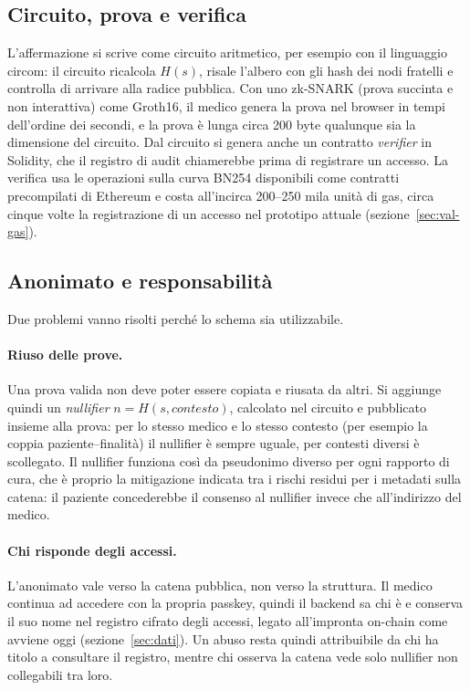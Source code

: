 \subsection{Circuito, prova e verifica}
L'affermazione si scrive come circuito aritmetico, per esempio con il linguaggio circom\cite{circom}: il circuito ricalcola $H(s)$, risale l'albero con gli hash dei nodi fratelli e controlla di arrivare alla radice pubblica. Con uno zk-SNARK (prova succinta e non interattiva) come Groth16\cite{groth16}, il medico genera la prova nel browser in tempi dell'ordine dei secondi, e la prova è lunga circa 200 byte qualunque sia la dimensione del circuito. Dal circuito si genera anche un contratto \emph{verifier} in Solidity, che il registro di audit chiamerebbe prima di registrare un accesso. La verifica usa le operazioni sulla curva BN254 disponibili come contratti precompilati di Ethereum\cite{eip1108} e costa all'incirca 200--250 mila unità di gas, circa cinque volte la registrazione di un accesso nel prototipo attuale (sezione~\ref{sec:val-gas}).

\subsection{Anonimato e responsabilità}
Due problemi vanno risolti perché lo schema sia utilizzabile.

\paragraph{Riuso delle prove.} Una prova valida non deve poter essere copiata e riusata da altri. Si aggiunge quindi un \emph{nullifier} $n = H(s, \mathit{contesto})$, calcolato nel circuito e pubblicato insieme alla prova: per lo stesso medico e lo stesso contesto (per esempio la coppia paziente--finalità) il nullifier è sempre uguale, per contesti diversi è scollegato. Il nullifier funziona così da pseudonimo diverso per ogni rapporto di cura, che è proprio la mitigazione indicata tra i rischi residui per i metadati sulla catena: il paziente concederebbe il consenso al nullifier invece che all'indirizzo del medico.

\paragraph{Chi risponde degli accessi.} L'anonimato vale verso la catena pubblica, non verso la struttura. Il medico continua ad accedere con la propria passkey, quindi il backend sa chi è e conserva il suo nome nel registro cifrato degli accessi, legato all'impronta on-chain come avviene oggi (sezione~\ref{sec:dati}). Un abuso resta quindi attribuibile da chi ha titolo a consultare il registro, mentre chi osserva la catena vede solo nullifier non collegabili tra loro.

